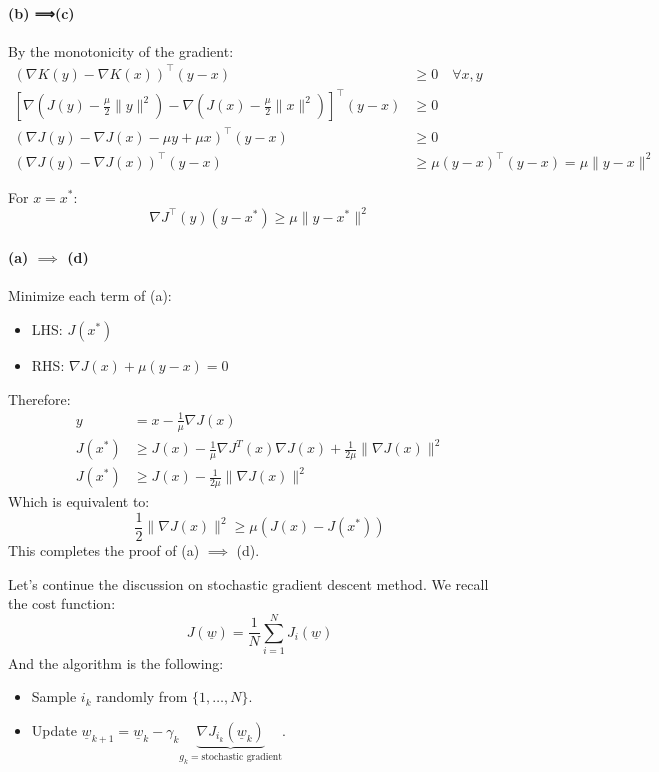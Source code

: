 \paragraph{(b) ⟹\implies (c)}

By the monotonicity of the gradient:
\begin{align*}
    (\nabla K(y) - \nabla K(x))^\top(y-x) &\geq 0 \quad \forall x, y \\
    \left[\nabla\left(J(y) - \frac{\mu}{2}\|y\|^2\right) - \nabla\left(J(x) - \frac{\mu}{2}\|x\|^2\right)\right]^\top(y-x) &\geq 0 \\
    \left(\nabla J(y) - \nabla J(x) - \mu y + \mu x\right)^\top(y-x) &\geq 0 \\
    (\nabla J(y) - \nabla J(x))^\top(y-x) &\geq \mu(y-x)^\top(y-x) = \mu\|y-x\|^2
\end{align*}

For $x = x^*$:
\[ \nabla J^\top(y)(y-x^*) \geq \mu\|y-x^*\|^2 \]

\paragraph{(a) $\implies$ (d)}

Minimize each term of (a):
\begin{itemize}
    \item LHS: $J(x^*)$
    \item RHS: $\nabla J(x) + \mu(y-x) = 0$
\end{itemize}
Therefore:
\begin{align*}
    y &= x - \frac{1}{\mu}\nabla J(x) \\
 J(x^*) & \geq J(x) - \frac{1}{\mu}\nabla J^T(x)\nabla J(x) + \frac{1}{2\mu}\|\nabla J(x)\|^2 \\
   J(x^*)  &\geq J(x) - \frac{1}{2\mu}\|\nabla J(x)\|^2
\end{align*}
Which is equivalent to:
\begin{equation*}
    \frac{1}{2}\|\nabla J(x)\|^2 \geq \mu(J(x) - J(x^*))
\end{equation*}
This completes the proof of (a) $\implies$ (d).

Let's continue the discussion on stochastic gradient descent method. We recall the cost function:
\[
    J(\underline{w}) = \dfrac{1}{N}\sum_{i=1}^N J_i(\underline{w})    
\]
And the algorithm is the following:
\begin{itemize}
    \item Sample $i_k$ randomly from $\{1, \dots, N\}$.
    \item Update $\underline{w}_{k+1} = \underline{w}_k - \gamma_k \underbrace{\nabla J_{i_k}(\underline{w}_k)}_{g_k = \text{stochastic gradient}}$.
\end{itemize}

